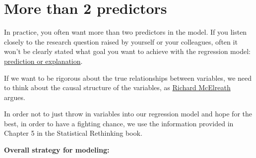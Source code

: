 \documentclass[
]{book}
\begin{document}
\section{More than 2 predictors}\label{more-than-2-predictors}

In practice, you often want more than two predictors in the model.
If you listen closely to the research question raised by yourself or
your colleagues, often it won't be clearly stated what goal you want to achieve
with the regression model:
\href{https://projecteuclid.org/journals/statistical-science/volume-25/issue-3/To-Explain-or-to-Predict/10.1214/10-STS330.full}{prediction or explanation}.

If we want to be rigorous about the true relationships between variables,
we need to think about the causal structure of the variables,
as \href{https://www.youtube.com/watch?v=YvhuYONl1o0&ab_channel=KI-Campus}{Richard McElreath}
argues.

In order not to just throw in variables into our regression model and hope for the best,
in order to have a fighting chance, we use the information provided
in Chapter 5 in the Statistical Rethinking book.

\textbf{Overall strategy for modeling:}
\end{document}
